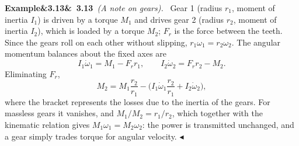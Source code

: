 \documentclass[11pt,a4paper,oneside]{report}
\numberwithin{equation}{chapter}
\theoremstyle{plain}
\theoremstyle{definition}
\theoremstyle{remark}
\newenvironment{example}[2]{%
  \par\addvspace{\bigskipamount}\noindent
  \textbf{Example\ifx&#1&\else~#1\fi}\ \textit{(#2).}\ \ignorespaces}%
  {\hfill$\blacktriangleleft$\par\addvspace{\bigskipamount}}
\begin{document}
\begin{example}{3.13}{A note on gears}
Gear 1 (radius $r_1$, moment of inertia $I_1$) is driven by a torque $M_1$ and drives gear 2 (radius $r_2$, moment of
inertia $I_2$), which is loaded by a torque $M_2$; $F_r$ is the force between the teeth. Since the gears roll on each other
without slipping, $r_1\omega_1=r_2\omega_2$. The angular momentum balances about the fixed axes are
\[
  I_1\dot\omega_1=M_1-F_rr_1,\qquad I_2\dot\omega_2=F_rr_2-M_2 .
\]
Eliminating $F_r$,
\[
  M_2=M_1\frac{r_2}{r_1}-\Big(I_1\dot\omega_1\frac{r_2}{r_1}+I_2\dot\omega_2\Big),
\]
where the bracket represents the losses due to the inertia of the gears. For massless gears it vanishes, and
$M_1/M_2=r_1/r_2$, which together with the kinematic relation gives $M_1\omega_1=M_2\omega_2$: the power is
transmitted unchanged, and a gear simply trades torque for angular velocity.
\end{example}
\end{document}
